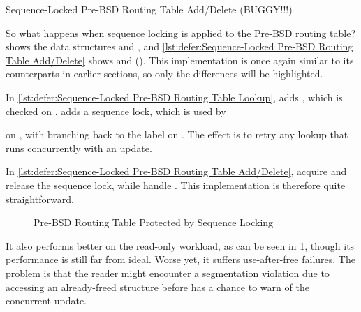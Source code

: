 \begin{listing}

\caption{Sequence-Locked Pre-BSD Routing Table Add\slash Delete (BUGGY!!!)}
\label{lst:defer:Sequence-Locked Pre-BSD Routing Table Add/Delete}
\end{listing}

So what happens when sequence locking is applied to the Pre-BSD
routing table?
shows the data structures and , and
\cref{lst:defer:Sequence-Locked Pre-BSD Routing Table Add/Delete}
shows  and  ().
This implementation is once again similar to its counterparts in earlier
sections, so only the differences will be highlighted.

\begin{fcvref}
In
\cref{lst:defer:Sequence-Locked Pre-BSD Routing Table Lookup},
 adds , which is checked on
.
 adds a sequence lock, which is used by 
\end{fcvref}
\begin{fcvref}
on ,
with  branching back to
the  label on .
The effect is to retry any lookup that runs concurrently with an update.
\end{fcvref}

\begin{fcvref}
In
\cref{lst:defer:Sequence-Locked Pre-BSD Routing Table Add/Delete},
acquire and release the sequence lock,
while  handle .
This implementation is therefore quite straightforward.
\end{fcvref}

\begin{figure}
\centering
{}
\caption{Pre-BSD Routing Table Protected by Sequence Locking}
\label{fig:defer:Pre-BSD Routing Table Protected by Sequence Locking}
\end{figure}

It also performs better on the read-only workload, as can be seen in
\cref{fig:defer:Pre-BSD Routing Table Protected by Sequence Locking},
though its performance is still far from ideal.
Worse yet, it suffers use-after-free failures.
The problem is that the reader might encounter a segmentation violation
due to accessing an already-freed structure before 
has a chance to warn of the concurrent update.

